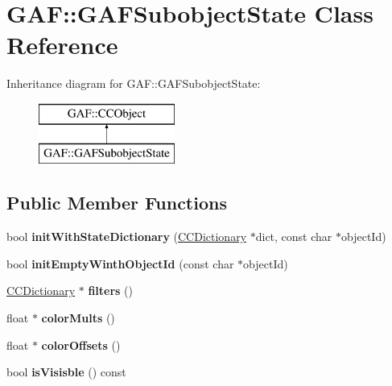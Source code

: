 \hypertarget{class_g_a_f_1_1_g_a_f_subobject_state}{\section{G\-A\-F\-:\-:G\-A\-F\-Subobject\-State Class Reference}
\label{class_g_a_f_1_1_g_a_f_subobject_state}
}
Inheritance diagram for G\-A\-F\-:\-:G\-A\-F\-Subobject\-State\-:\begin{figure}[H]
\begin{center}
\leavevmode
\includegraphics[height=2.000000cm]{class_g_a_f_1_1_g_a_f_subobject_state}
\end{center}
\end{figure}
\subsection*{Public Member Functions}
\begin{DoxyCompactItemize}
\item 
\hypertarget{class_g_a_f_1_1_g_a_f_subobject_state_ae5f69c2547384b4b1599eedf36cd6821}{bool {\bfseries init\-With\-State\-Dictionary} (\hyperlink{class_g_a_f_1_1_c_c_dictionary}{C\-C\-Dictionary} $\ast$dict, const char $\ast$object\-Id)}\label{class_g_a_f_1_1_g_a_f_subobject_state_ae5f69c2547384b4b1599eedf36cd6821}

\item 
\hypertarget{class_g_a_f_1_1_g_a_f_subobject_state_a8a9711a7df7a1211e8502b997de314d2}{bool {\bfseries init\-Empty\-Winth\-Object\-Id} (const char $\ast$object\-Id)}\label{class_g_a_f_1_1_g_a_f_subobject_state_a8a9711a7df7a1211e8502b997de314d2}

\item 
\hypertarget{class_g_a_f_1_1_g_a_f_subobject_state_a572cb5d24227630b969e9b12c8a8c1c9}{\hyperlink{class_g_a_f_1_1_c_c_dictionary}{C\-C\-Dictionary} $\ast$ {\bfseries filters} ()}\label{class_g_a_f_1_1_g_a_f_subobject_state_a572cb5d24227630b969e9b12c8a8c1c9}

\item 
\hypertarget{class_g_a_f_1_1_g_a_f_subobject_state_ae40fb62651bfeed23b670abd0a21a962}{float $\ast$ {\bfseries color\-Mults} ()}\label{class_g_a_f_1_1_g_a_f_subobject_state_ae40fb62651bfeed23b670abd0a21a962}

\item 
\hypertarget{class_g_a_f_1_1_g_a_f_subobject_state_a2ac1e9465fddc6cac9223506644484d1}{float $\ast$ {\bfseries color\-Offsets} ()}\label{class_g_a_f_1_1_g_a_f_subobject_state_a2ac1e9465fddc6cac9223506644484d1}

\item 
\hypertarget{class_g_a_f_1_1_g_a_f_subobject_state_ad481472523fdf6f2d4881445039f5ea7}{bool {\bfseries is\-Visisble} () const }\label{class_g_a_f_1_1_g_a_f_subobject_state_ad481472523fdf6f2d4881445039f5ea7}

\end{DoxyCompactItemize}
